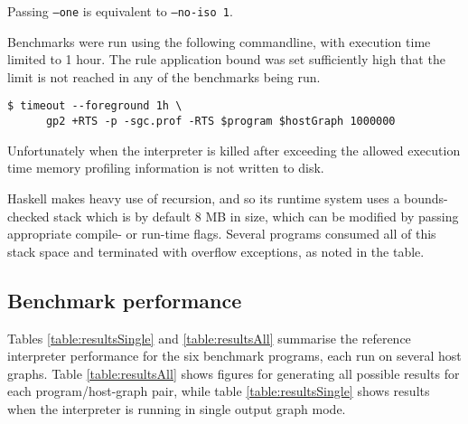 Passing \texttt{--one} is equivalent to \texttt{--no-iso 1}.


Benchmarks were run using the following commandline, with execution time limited to 1 hour. The rule application bound was set sufficiently high that the limit is not reached in any of the benchmarks being run.

\begin{verbatim}
$ timeout --foreground 1h \
      gp2 +RTS -p -sgc.prof -RTS $program $hostGraph 1000000
\end{verbatim}

Unfortunately when the interpreter is killed after exceeding the allowed execution time memory profiling information is not written to disk.



Haskell makes heavy use of recursion, and so its runtime system uses a bounds-checked stack which is by default 8 MB in size, which can be modified by passing appropriate compile- or run-time flags. Several programs consumed all of this stack space and terminated with overflow exceptions, as noted in the table. %





\subsection{Benchmark performance}

Tables \ref{table:resultsSingle} and \ref{table:resultsAll} summarise the reference interpreter performance for the six benchmark programs, each run on several host graphs. Table \ref{table:resultsAll} shows figures for generating all possible results for each program/host-graph pair, while table \ref{table:resultsSingle} shows results when the interpreter is running in single output graph mode.

